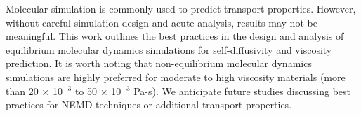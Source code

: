 \documentclass[9pt,bestpractices]{livecoms}
\begin{document}
%

Molecular simulation is commonly used to predict transport properties. However, without careful simulation design and acute analysis, results may not be meaningful. This work outlines the best practices in the design and analysis of equilibrium molecular dynamics simulations for self-diffusivity and viscosity prediction. It is worth noting that non-equilibrium molecular dynamics simulations are highly preferred for moderate to high viscosity materials (more than 20 $\times$ 10$^{-3}$ to 50 $\times$ 10$^{-3}$ Pa-s). We anticipate future studies discussing best practices for NEMD techniques or additional transport properties.
\end{document}
